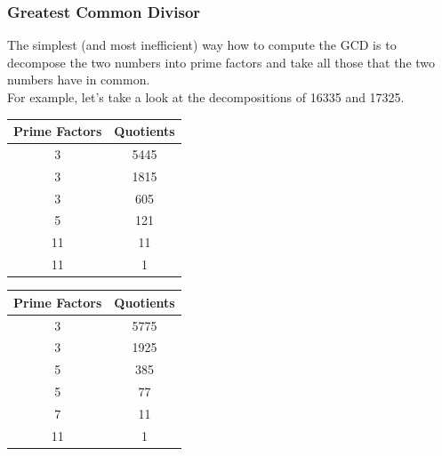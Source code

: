 \documentclass[aspectratio=169,11pt,usenames,dvipsnames]{beamer}
\begin{document}
\begin{frame}
 \frametitle{Greatest Common Divisor}
 The simplest (and most inefficient) way how to compute the GCD is to decompose
 the two numbers into prime factors and take all those that the two numbers have
 in common.\\
 \pause
 For example, let's take a look at the decompositions of 16335 and 17325.\\
 \vspace{1em}
 \centering
 \begin{minipage}{.48\textwidth}
  \centering
   \begin{tabular}{c|c}
    \textbf{Prime Factors} & \textbf{Quotients}\\
    \toprule
    3 & 5445\\
    3 & 1815\\
    3 & 605\\
    5 & 121\\
    11 & 11\\
    11 & 1
  \end{tabular}
 \end{minipage}
 \begin{minipage}{.48\textwidth}
   \begin{tabular}{c|c}
    \textbf{Prime Factors} & \textbf{Quotients}\\
    \toprule
    3 & 5775\\
    3 & 1925\\
    5 & 385\\
    5 & 77\\
    7 & 11\\
    11 & 1
  \end{tabular}
 \end{minipage}
\end{frame}
\end{document}
